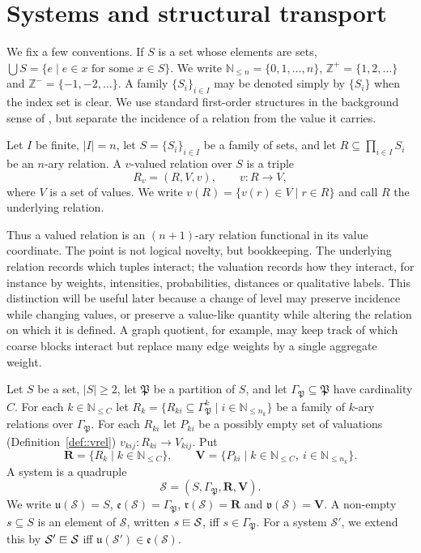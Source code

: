 \documentclass[runningheads]{llncs}
\newcommand{\N}{\mathbb{N}}
\newcommand{\Z}{\mathbb{Z}}
\newcommand\sqin{\mathrel{\raisebox{0.1ex}{\ooalign{$\sqsubset$\cr $-$}}}}
\begin{document}
\section{Systems and structural transport}

We fix a few conventions. If $S$ is a set whose elements are sets, $\bigcup S=\{e\mid e\in x\text{ for some }x\in S\}$. We write $\N_{\leq n}=\{0,1,\ldots,n\}$, $\Z^+=\{1,2,\ldots\}$ and $\Z^- =\{-1,-2,\ldots\}$. A family $\{S_i\}_{i\in I}$ may be denoted simply by $\{S_i\}$ when the index set is clear. We use standard first-order structures in the background sense of \cite{Poizat2000}, but separate the incidence of a relation from the value it carries.

\begin{definition}\label{def::vrel}
Let $I$ be finite, $|I|=n$, let $S=\{S_i\}_{i\in I}$ be a family of sets, and let $R\subseteq \prod_{i\in I}S_i$ be an $n$-ary relation. A $v$-valued relation over $S$ is a triple
\[
R_v=(R,V,v),\qquad v:R\to V,
\]
where $V$ is a set of values. We write $v(R)=\{v(r)\in V\mid r\in R\}$ and call $R$ the underlying relation.
\end{definition}

Thus a valued relation is an $(n+1)$-ary relation functional in its value coordinate. The point is not logical novelty, but bookkeeping. The underlying relation records which tuples interact; the valuation records how they interact, for instance by weights, intensities, probabilities, distances or qualitative labels. This distinction will be useful later because a change of level may preserve incidence while changing values, or preserve a value-like quantity while altering the relation on which it is defined. A graph quotient, for example, may keep track of which coarse blocks interact but replace many edge weights by a single aggregate weight.

\begin{definition}[System]\label{sys}
Let $S$ be a set, $|S|\geq 2$, let $\mathfrak P$ be a partition of $S$, and let $\Gamma_{\mathfrak P}\subseteq\mathfrak P$ have cardinality $C$. For each $k\in\N_{\leq C}$ let $R_k=\{R_{ki}\subseteq \Gamma_{\mathfrak P}^{k}\mid i\in\N_{\leq n_k}\}$ be a family of $k$-ary relations over $\Gamma_{\mathfrak P}$. For each $R_{ki}$ let $P_{ki}$ be a possibly empty set of valuations (Definition~\ref{def::vrel}) $v_{kij}:R_{ki}\to V_{kij}$. Put
\[
\mathbf R=\{R_k\mid k\in\N_{\leq C}\},\qquad
\mathbf V=\{P_{ki}\mid k\in\N_{\leq C},\ i\in\N_{\leq n_k}\}.
\]
A system is a quadruple
\[
\mathcal S=(S,\Gamma_{\mathfrak P},\mathbf R,\mathbf V).
\]
We write $\mathfrak u(\mathcal S)=S$, $\mathfrak e(\mathcal S)=\Gamma_{\mathfrak P}$, $\mathfrak r(\mathcal S)=\mathbf R$ and $\mathfrak v(\mathcal S)=\mathbf V$. A non-empty $s\subseteq S$ is an element of $\mathcal S$, written $s\sqin\mathcal S$, iff $s\in\Gamma_{\mathfrak P}$. For a system $\mathcal S'$, we extend this by $\mathcal S'\sqin\mathcal S$ iff $\mathfrak u(\mathcal S')\in\mathfrak e(\mathcal S)$.
\end{definition}
\end{document}

